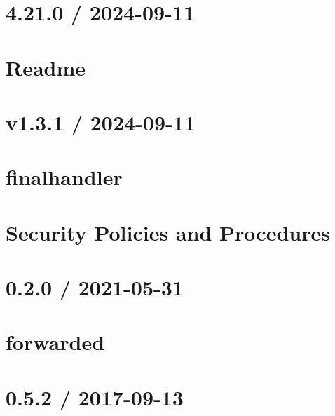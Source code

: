 \documentclass[twoside]{book}
\newcommand{\+}{\discretionary{\mbox{\scriptsize$\hookleftarrow$}}{}{}}
\begin{document}
\chapter{4.21.0 / 2024-\/09-\/11}
\label{md_Backend_nodejs_node_modules_express_History}

\chapter{Readme}
\label{md_Backend_nodejs_node_modules_express_Readme}

\chapter{v1.3.1 / 2024-\/09-\/11}
\label{md_Backend_nodejs_node_modules_finalhandler_HISTORY}

\chapter{finalhandler}
\label{md_Backend_nodejs_node_modules_finalhandler_README}

\chapter{Security Policies and Procedures}
\label{md_Backend_nodejs_node_modules_finalhandler_SECURITY}

\chapter{0.2.0 / 2021-\/05-\/31}
\label{md_Backend_nodejs_node_modules_forwarded_HISTORY}

\chapter{forwarded}
\label{md_Backend_nodejs_node_modules_forwarded_README}

\chapter{0.5.2 / 2017-\/09-\/13}
\label{md_Backend_nodejs_node_modules_fresh_HISTORY}

\end{document}
